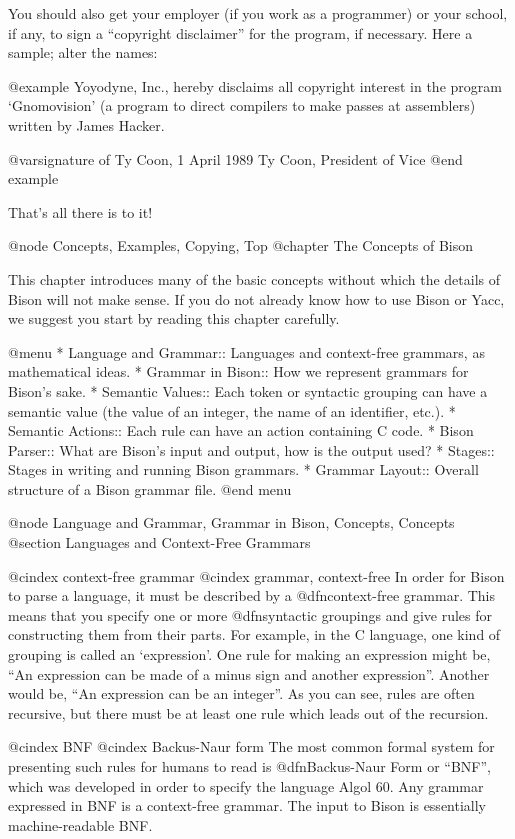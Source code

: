 You should also get your employer (if you work as a programmer) or your
school, if any, to sign a ``copyright disclaimer'' for the program, if
necessary.  Here a sample; alter the names:

@example
Yoyodyne, Inc., hereby disclaims all copyright interest in the
program `Gnomovision' (a program to direct compilers to make passes
at assemblers) written by James Hacker.

@var{signature of Ty Coon}, 1 April 1989
Ty Coon, President of Vice
@end example

That's all there is to it!

@node Concepts, Examples, Copying, Top
@chapter The Concepts of Bison

This chapter introduces many of the basic concepts without which the
details of Bison will not make sense.  If you do not already know how to
use Bison or Yacc, we suggest you start by reading this chapter carefully.

@menu
* Language and Grammar::  Languages and context-free grammars,
			    as mathematical ideas.
* Grammar in Bison::      How we represent grammars for Bison's sake.
* Semantic Values::       Each token or syntactic grouping can have
                            a semantic value (the value of an integer,
                            the name of an identifier, etc.).
* Semantic Actions::      Each rule can have an action containing C code.
* Bison Parser::          What are Bison's input and output,
                            how is the output used?
* Stages::		  Stages in writing and running Bison grammars.
* Grammar Layout::        Overall structure of a Bison grammar file.
@end menu

@node Language and Grammar, Grammar in Bison, Concepts, Concepts
@section Languages and Context-Free Grammars

@cindex context-free grammar
@cindex grammar, context-free
In order for Bison to parse a language, it must be described by a
@dfn{context-free grammar}.  This means that you specify one or more
@dfn{syntactic groupings} and give rules for constructing them from their
parts.  For example, in the C language, one kind of grouping is called an
`expression'.  One rule for making an expression might be, ``An expression
can be made of a minus sign and another expression''.  Another would be,
``An expression can be an integer''.  As you can see, rules are often
recursive, but there must be at least one rule which leads out of the
recursion.

@cindex BNF
@cindex Backus-Naur form
The most common formal system for presenting such rules for humans to read
is @dfn{Backus-Naur Form} or ``BNF'', which was developed in order to
specify the language Algol 60.  Any grammar expressed in BNF is a
context-free grammar.  The input to Bison is essentially machine-readable
BNF.

